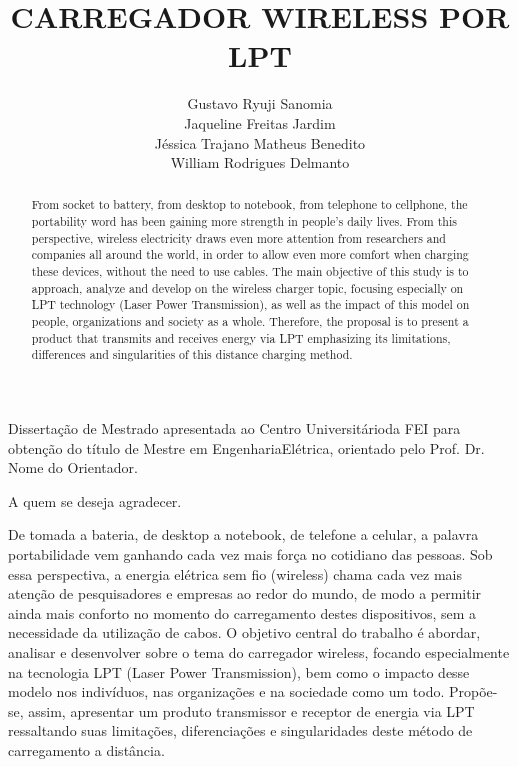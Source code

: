 \documentclass[numeric]{fei}
\title{CARREGADOR WIRELESS POR LPT}
\author{
	Gustavo Ryuji Sanomia\\
	Jaqueline Freitas Jardim\\
	Jéssica Trajano Matheus Benedito\\
	William Rodrigues Delmanto
}
\begin{document}
\maketitle

\begin{folhaderosto}
Dissertação de Mestrado apresentada ao Centro Universitárioda FEI para obtenção do título de Mestre em EngenhariaElétrica, orientado pelo Prof. Dr. Nome do Orientador.
\end{folhaderosto}

\fichacatalografica
\folhadeaprovacao


\begin{agradecimentos}
A quem se deseja agradecer.
\end{agradecimentos}

\begin{resumo}
De tomada a bateria, de desktop a notebook, de telefone a celular, a palavra portabilidade vem ganhando cada vez mais força no cotidiano das pessoas. Sob essa perspectiva, a energia elétrica sem fio (wireless) chama cada vez mais atenção de pesquisadores e empresas ao redor do mundo, de modo a permitir ainda mais conforto no momento do carregamento destes dispositivos, sem a necessidade da utilização de cabos. O objetivo central do trabalho é abordar, analisar e desenvolver sobre o tema do carregador wireless, focando especialmente na tecnologia LPT (Laser Power Transmission), bem como o impacto desse modelo nos indivíduos, nas organizações e na sociedade como um todo. Propõe-se, assim, apresentar um produto transmissor e receptor de energia via LPT ressaltando suas limitações, diferenciações e singularidades deste método de carregamento a distância.
\end{resumo}

\begin{abstract}
From socket to battery, from desktop to notebook, from telephone to cellphone, the portability word has been gaining more strength in people's daily lives. From this perspective, wireless electricity draws even more attention from researchers and companies all around the world, in order to allow even more comfort when charging these devices, without the need to use cables. The main objective of this study is to approach, analyze and develop on the wireless charger topic, focusing especially on LPT technology (Laser Power Transmission), as well as the impact of this model on people, organizations and society as a whole. Therefore, the proposal is to present a product that transmits and receives energy via LPT emphasizing its limitations, differences and singularities of this distance charging method.
\end{abstract}
\end{document}
